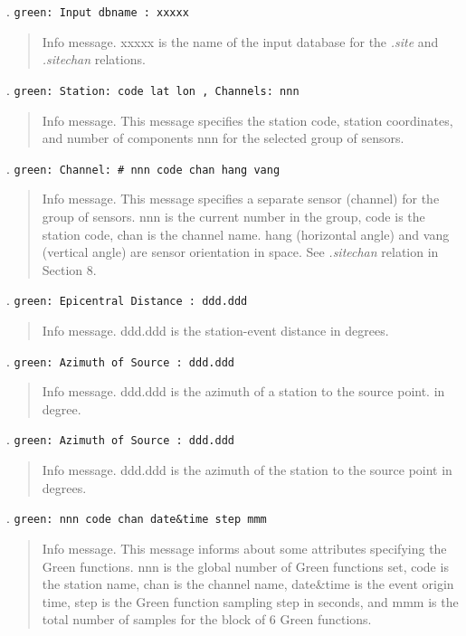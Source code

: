. \texttt{green: Input dbname : xxxxx}
\begin{quote}
Info message. xxxxx is the name of the input database for the {\it .site} and 
{\it .sitechan} relations.
\end{quote}
. \texttt{green: Station: code     lat   lon , Channels: nnn}
\begin{quote}
Info message. This message specifies the station code, station coordinates, 
and number of components nnn for the selected group of sensors.
\end{quote}
. \texttt{green: Channel: \#  nnn  code   chan  hang vang}
\begin{quote}
Info message. This message specifies a separate sensor (channel) for
the group of sensors. nnn is the current number in the group, code is the
station code, chan is the channel name. hang (horizontal angle) and vang 
(vertical angle) are sensor orientation
in space. See {\it .sitechan} relation in Section 8.
\end{quote}
. \texttt{green: Epicentral Distance :    ddd.ddd}
\begin{quote}
Info message. ddd.ddd is the station-event distance in degrees.
\end{quote}
. \texttt{green: Azimuth of Source :    ddd.ddd}
\begin{quote}
Info message. ddd.ddd is the azimuth of a station to the source point.
in degree.
\end{quote}
. \texttt{green: Azimuth of Source :    ddd.ddd}
\begin{quote}
Info message. ddd.ddd is the azimuth of  the station to the source point
 in degrees.
\end{quote}
. \texttt{green:   nnn code    chan  date\&time  step   mmm}
\begin{quote}
Info message. This message informs about some attributes specifying the
Green functions. nnn is the global number of Green functions set, code is the
station name, chan is the channel name, date\&time is the event origin 
time, step is the Green function sampling step in seconds, and mmm is 
the total number of samples for the block of 6 Green functions. 
\end{quote}
